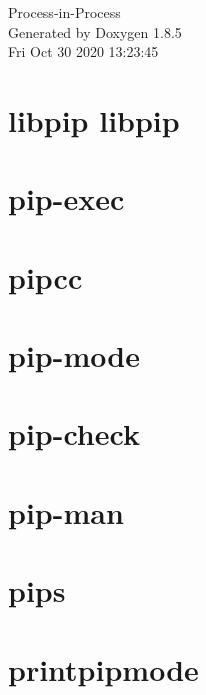 \documentclass[twoside]{book}
\newcommand{\clearemptydoublepage}{%
  \newpage{\pagestyle{empty}\cleardoublepage}%
}
\begin{document}
\hypersetup{pageanchor=false}
\begin{titlepage}
\vspace*{7cm}
\begin{center}%
{\Large Process-\/in-\/\-Process }\\
\vspace*{1cm}
{\large Generated by Doxygen 1.8.5}\\
\vspace*{0.5cm}
{\small Fri Oct 30 2020 13:23:45}\\
\end{center}
\end{titlepage}
\clearemptydoublepage
\tableofcontents
\clearemptydoublepage
{}
\hypersetup{pageanchor=true}

\chapter{libpip libpip}
\label{index}\hypertarget{index}{}
\chapter{pip-\/exec}
\label{pip-exec}
\hypertarget{pip-exec}{}

\chapter{pipcc}
\label{pipcc}
\hypertarget{pipcc}{}

\chapter{pip-\/mode}
\label{pip-mode}
\hypertarget{pip-mode}{}

\chapter{pip-\/check}
\label{pip-check}
\hypertarget{pip-check}{}

\chapter{pip-\/man}
\label{pip-man}
\hypertarget{pip-man}{}

\chapter{pips}
\label{pips}
\hypertarget{pips}{}

\chapter{printpipmode}
\label{printpipmode}
\hypertarget{printpipmode}{}

\end{document}
